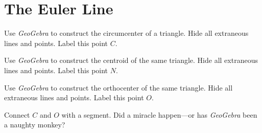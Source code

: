 \newpage
\section{The Euler Line} 



\begin{prob} 
Use \textsl{GeoGebra} to construct the circumcenter of a
triangle. Hide all extraneous lines and points. Label this point $C$.
\end{prob}

\begin{prob} 
Use \textsl{GeoGebra} to construct the centroid of the same triangle. Hide
all extraneous lines and points. Label this point $N$.
\end{prob}
\begin{prob} 
Use \textsl{GeoGebra} to construct the orthocenter of the same triangle. Hide
all extraneous lines and points. Label this point $O$.
\end{prob}

\begin{prob} 
Connect $C$ and $O$ with a segment. Did a miracle happen---or has
\textsl{GeoGebra} been a naughty monkey?
\end{prob}









